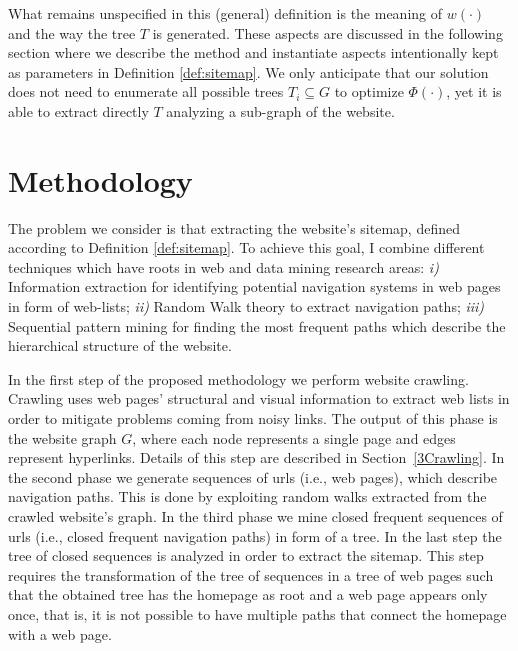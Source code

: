 \noindent

What remains unspecified in this (general) definition is the meaning of $w(\cdot)$ and the way the tree $T$ is generated. These aspects are discussed in the following section where we describe the method and instantiate aspects intentionally kept as parameters in Definition \ref{def:sitemap}.
We only anticipate that our solution does not need to enumerate all possible trees $T_i \subseteq G$ to optimize $\Phi(\cdot)$, yet it is able to extract directly $T$ analyzing a sub-graph of the website.

\section{Methodology}
\label{sec:methodology}


The problem we consider is that extracting the website's sitemap, defined according to Definition \ref{def:sitemap}. To achieve this goal, I combine different techniques which have roots in  web and data mining research areas: \emph{i)} Information extraction for identifying potential navigation systems in web pages in form of web-lists; \emph{ii) } Random Walk theory to extract navigation paths; \emph{iii)} Sequential pattern mining for finding the most frequent paths which describe the hierarchical structure of the website. 


In the first step of the proposed methodology we perform website crawling. Crawling uses web pages' structural and visual information to extract web lists in order to mitigate problems coming from noisy links. 
The output of this phase is the website graph $G$, where each node represents a single page and edges represent hyperlinks. Details of this step are described in Section~\ref{3Crawling}.
In the second phase we generate sequences of urls (i.e., web pages), which describe navigation paths. This is done by exploiting random walks extracted from the crawled website's graph. In the third phase we mine closed frequent sequences of urls (i.e., closed frequent navigation paths) in form of a tree.
In the last step the tree of closed sequences is analyzed in order to extract the sitemap. This step requires the transformation of the tree of sequences in a tree of web pages such that the obtained tree has the homepage as root and a web page appears only once, that is, it is not possible to have multiple paths that connect the homepage with a web page. 



